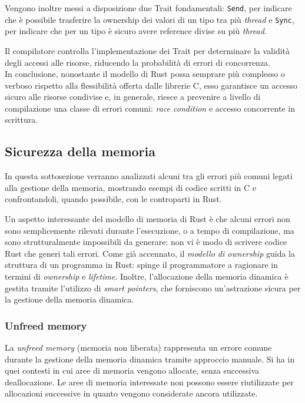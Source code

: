 Vengono inoltre messi a disposizione due Trait fondamentali: \texttt{Send}, per indicare che è possibile trasferire la ownership dei valori di un tipo tra più \textit{thread} e \texttt{Sync}, per indicare che per un tipo è sicuro avere reference divise su più \textit{thread}.

Il compilatore controlla l'implementazione dei Trait per determinare la validità degli accessi alle risorse, riducendo la probabilità di errori di concorrenza. \hfill
\vspace{10pt}\\
\noindent In conclusione, nonostante il modello di Rust possa semprare più complesso o verboso rispetto alla flessibilità offerta dalle librerie C, esso
garantisce un accesso sicuro alle risorse condivise e, in generale, riesce a prevenire a livello di compilazione una classe di errori comuni: \textit{race condition} e accesso concorrente in scrittura.

\subsection{Sicurezza della memoria}\label{sub:mem-safe}
In questa sottosezione verranno analizzati alcuni tra gli errori più comuni legati alla gestione della memoria,
mostrando esempi di codice scritti in C e confrontandoli, quando possibile, con le controparti in Rust.

Un aspetto interessante del modello di memoria di Rust è che alcuni errori non sono semplicemente rilevati
durante l'esecuzione, o a tempo di compilazione, ma sono strutturalmente impossibili da generare: non vi è modo di scrivere codice Rust che generi tali errori.
Come già accennato, il \textit{modello di ownership} guida la struttura di un programma in Rust: spinge il programmatore a
ragionare in termini di \textit{ownership} e \textit{lifetime}. Inoltre, l'allocazione della memoria dinamica è gestita tramite l'utilizzo
di \textit{smart pointers}, che forniscono un'astrazione sicura per la gestione della memoria dinamica.

\subsubsection{Unfreed memory}
La \textit{unfreed memory} (memoria non liberata) rappresenta un errore comune durante la gestione della memoria dinamica tramite approccio manuale.
Si ha in quei contesti in cui aree di memoria vengono allocate, senza successiva deallocazione. Le aree di memoria interessate non
possono essere riutilizzate per allocazioni successive in quanto vengono considerate ancora utilizzate.

